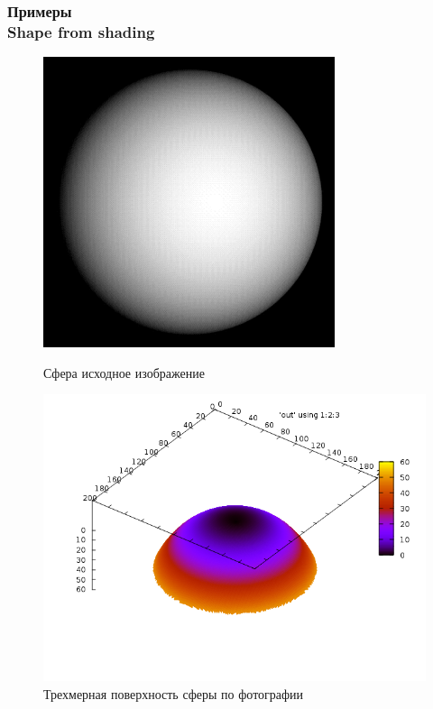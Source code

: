 \documentclass[hyperref={unicode=true},professionalfont]{beamer}
\newcommand{\stamp}{
	\begin{frame}[plain,noframenumbering]
		\begin{table}[h!]
			\flushright
			\vspace{5cm}
			\begin{adjustbox}{max width=0.7\textwidth}
				\begin{tabular}{
					|>{\footnotesize}p{0.8cm}|
					>{\footnotesize}p{0.8cm}|
					>{\footnotesize}p{2.2cm}|
					>{\footnotesize}p{1.1cm}|
					>{\footnotesize}p{0.8cm}|
					>{\footnotesize}p{5cm}|
					>{\footnotesize}p{0.1cm}|
					>{\footnotesize}p{0.1cm}|
					>{\footnotesize}p{0.1cm}|
					>{\footnotesize}p{0.8cm}|
					>{\footnotesize}p{1.4cm}|
				}
					\hline
					&&&&& \multicolumn{6}{>{\footnotesize}c|}{\multirow{3}{*}{\Large 0.043.00.00 ПЗ}} \\ \cline{1-5}
					&&&&& \multicolumn{6}{>{\footnotesize}c|}{} \\ \cline{1-5}
					Изм. & Лист & № Документа & Подпись & Дата & \multicolumn{6}{>{\footnotesize}c|}{} \\ \hline
					\multicolumn{2}{|>{\footnotesize}l|}{Разработал}
                    & Апанович Д.В. &  &  &
                                            \multirow{4}{5cm}{\centering
                                            Параллельный алгоритм
                                            численного решения
                                            анизотропного уравнения эйконала} & \multicolumn{3}{>{\footnotesize}l|}{Лит.} & Лист & Листов \\ \cline{1-5}\cline{7-11}
					\multicolumn{2}{|>{\footnotesize}l|}{Проверил}
                    & Казаков А.Л. &  &  &  & У & & & \insertframenumber & \inserttotalframenumber \\ \cline{1-5}\cline{7-11}
					\multicolumn{2}{|>{\footnotesize}l|}{Нормоконтролер}
                    & Казаков А.Л. &  &  &  & \multicolumn{5}{>{\footnotesize}l|}{} \\ \cline{1-5}
					\multicolumn{2}{|>{\footnotesize}l|}{} &  &  &  &  & \multicolumn{5}{>{\footnotesize}l|}{Кафедра АС, гр. ИСТм-16-1} \\ \cline{1-5}
					\multicolumn{2}{|>{\footnotesize}l|}{Утвердил}
                    & Бахвалов С.В. &  &  &  & \multicolumn{5}{>{\footnotesize}l|}{} \\ \hline

				\end{tabular}
			\end{adjustbox}
		\end{table}

	\end{frame}
}
\renewcommand{\stamp}{}
\begin{document}
\begin{frame}
  \frametitle{Примеры \\ Shape from shading}

  \begin{figure}[ht]
    \begin{minipage}[h]{0.49\linewidth}
      \centering
      \includegraphics[width=0.9\linewidth]{sphere_in.png}
      \hfil \caption{Сфера исходное изображение}
      \label{fig:ex:1:in}

    \end{minipage}
    \begin{minipage}[ht]{0.49\linewidth}
      \centering
      \includegraphics[width=0.9\linewidth]{sphere.png}
      \hfil \caption{Трехмерная поверхность сферы по фотографии}
      \label{fig:ex:1:out}

    \end{minipage}
  \end{figure}

\end{frame}
\stamp
\end{document}
